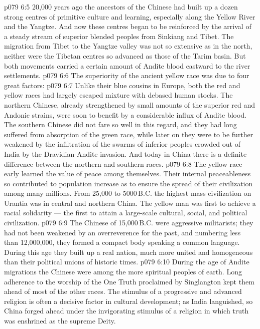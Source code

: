 \vs p079 6:5 20,000 years ago the ancestors of the Chinese had built up a dozen strong centres of primitive culture and learning, especially along the Yellow River and the Yangtze. And now these centres began to be reinforced by the arrival of a steady stream of superior blended peoples from Sinkiang and Tibet. The migration from Tibet to the Yangtze valley was not so extensive as in the north, neither were the Tibetan centres so advanced as those of the Tarim basin. But both movements carried a certain amount of Andite blood eastward to the river settlements.
\vs p079 6:6 The superiority of the ancient yellow race was due to four great factors:
\vs p079 6:7 \bibnobreakspace {} Unlike their blue cousins in Europe, both the red and yellow races had largely escaped mixture with debased human stocks. The northern Chinese, already strengthened by small amounts of the superior red and Andonic strains, were soon to benefit by a considerable influx of Andite blood. The southern Chinese did not fare so well in this regard, and they had long suffered from absorption of the green race, while later on they were to be further weakened by the infiltration of the swarms of inferior peoples crowded out of India by the Dravidian\hyp{}Andite invasion. And today in China there is a definite difference between the northern and southern races.
\vs p079 6:8 \bibnobreakspace {} The yellow race early learned the value of peace among themselves. Their internal peaceableness so contributed to population increase as to ensure the spread of their civilization among many millions. From 25,000 to 5000\,B.C. the highest mass civilization on Urantia was in central and northern China. The yellow man was first to achieve a racial solidarity --- the first to attain a large\hyp{}scale cultural, social, and political civilization.
\vs p079 6:9 The Chinese of 15,000\,B.C. were aggressive militarists; they had not been weakened by an overreverence for the past, and numbering less than 12,000,000, they formed a compact body speaking a common language. During this age they built up a real nation, much more united and homogeneous than their political unions of historic times.
\vs p079 6:10 \bibnobreakspace {} During the age of Andite migrations the Chinese were among the more spiritual peoples of earth. Long adherence to the worship of the One Truth proclaimed by Singlangton kept them ahead of most of the other races. The stimulus of a progressive and advanced religion is often a decisive factor in cultural development; as India languished, so China forged ahead under the invigorating stimulus of a religion in which truth was enshrined as the supreme Deity.
